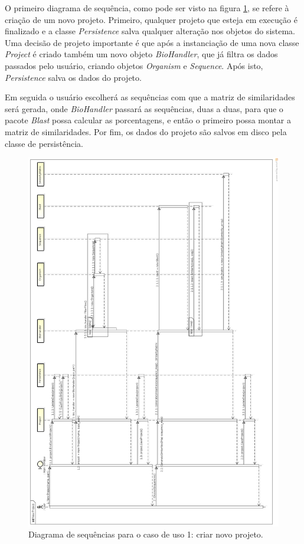 O primeiro diagrama de sequência, como pode ser visto na figura \ref{fig:new-project}, se refere à criação de um novo projeto. Primeiro, qualquer projeto
que esteja em execução é finalizado e a classe \textit{Persistence} salva qualquer alteração nos objetos do sistema. Uma decisão de projeto importante
é que após a instanciação de uma nova classe \textit{Project} é criado também um novo objeto \textit{BioHandler}, que já filtra os dados passados pelo
usuário, criando objetos \textit{Organism} e \textit{Sequence}. Após isto, \textit{Persistence} salva os dados do projeto.

Em seguida o usuário escolherá as sequências com que a matriz de similaridades será gerada, onde \textit{BioHandler} passará as sequências, duas a duas,
para que o pacote \textit{Blast} possa calcular as porcentagens, e então o primeiro possa montar a matriz de similaridades. Por fim, os dados do projeto
são salvos em disco pela classe de persistência. \newline

\begin{figure}
\centering
\includegraphics[scale=0.27]{new-project}
\caption{Diagrama de sequências para o caso de uso 1: criar novo projeto.}
\label{fig:new-project}
\end{figure}

